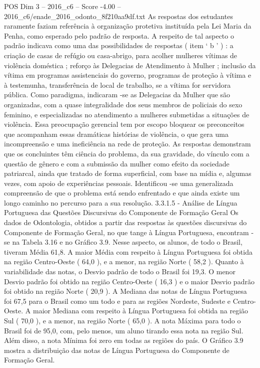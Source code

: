 \begin{textsample}{POS Dim 3 – 2016\_c6 – Score -4.00 – 2016\_c6/enade\_2016\_odonto\_8f210aa9df.txt}
As respostas dos estudantes raramente faziam referência à organização protetiva instituída pela Lei Maria da Penha, como esperado pelo padrão de resposta.
A respeito de tal aspecto o padrão indicava como uma das possibilidades de respostas ( item ‘ b ’ ) : a criação de casas de refúgio ou casa-abrigo, para acolher mulheres vítimas de violência doméstica ; reforço às Delegacias de Atendimento à Mulher ; inclusão da vítima em programas assistenciais do governo, programas de proteção à vítima e à testemunha, transferência de local de trabalho, se a vítima for servidora pública.
Como paradigma, indicaram -se as Delegacias da Mulher que são organizadas, com a quase integralidade dos seus membros de policiais do sexo feminino, e especializadas no atendimento a mulheres submetidas a situações de violência.
Essa preocupação gerencial tem por escopo bloquear os preconceitos que acompanham essas dramáticas histórias de violência, o que gera uma incompreensão e uma ineficiência na rede de proteção.
As respostas demonstram que os concluintes têm ciência do problema, da sua gravidade, do vínculo com a questão de gênero e com a submissão da mulher como efeito da sociedade patriarcal, ainda que tratado de forma superficial, com base na mídia e, algumas vezes, com apoio de experiências pessoais.
Identificou -se uma generalizada compreensão de que o problema está sendo enfrentado e que ainda existe um longo caminho no percurso para a sua resolução. 3.3.1.5 - Análise de Língua Portuguesa das Questões Discursivas do Componente de Formação Geral Os dados de Odontologia, obtidos a partir das respostas às questões discursivas do Componente de Formação Geral, no que tange à Língua Portuguesa, encontram -se na Tabela 3.16 e no Gráfico 3.9.
Nesse aspecto, os alunos, de todo o Brasil, tiveram Média 61,8.
A maior Média com respeito à Língua Portuguesa foi obtida na região Centro-Oeste ( 64,0 ), e a menor, na região Norte ( 58,2 ).
Quanto à variabilidade das notas, o Desvio padrão de todo o Brasil foi 19,3.
O menor Desvio padrão foi obtido na região Centro-Oeste ( 16,3 ) e o maior Desvio padrão foi obtido na região Norte ( 20,9 ).
A Mediana das notas de Língua Portuguesa foi 67,5 para o Brasil como um todo e para as regiões Nordeste, Sudeste e Centro-Oeste.
A maior Mediana com respeito à Língua Portuguesa foi obtida na região Sul ( 70,0 ), e a menor, na região Norte ( 65,0 ).
A nota Máxima para todo o Brasil foi de 95,0, com, pelo menos, um aluno tirando essa nota na região Sul.
Além disso, a nota Mínima foi zero em todas as regiões do país.
O Gráfico 3.9 mostra a distribuição das notas de Língua Portuguesa do Componente de Formação Geral.

\end{textsample}
